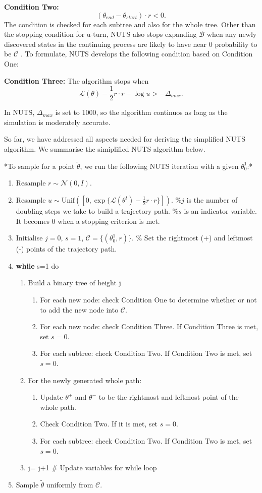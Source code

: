 \documentclass{article}
\begin{document}
\textbf{Condition Two:}
$$(\theta_{end}-\theta_{start})\cdot r < 0.$$
The condition is checked for each subtree and also for the whole tree. Other than the stopping condition for u-turn, NUTS also stops expanding $\mathcal{B}$ when any newly discovered states in the continuing process are likely to have near 0 probability to be $\mathcal{C}$ . To formulate, NUTS develops the following condition based on Condition One:

\textbf{Condition Three:}
The algorithm stops when
$$\mathcal{L}(\theta) -\frac{1}{2}r\cdot r -\log u > -\Delta_{max}.$$

In NUTS, $\Delta_{max}$ is set to 1000, so the algorithm continuos as long as the simulation is moderately accurate.

So far, we have addressed all aspects needed for deriving the simplified NUTS algorithm. We summarise the simiplified NUTS algorithm below.

*To sample for a point $\tilde{\theta}$, we run the following NUTS iteration with a given $\theta_0^1$:*

\begin{enumerate}
\item Resample $r\sim\mathcal{N}(0,I)$.
\item Resample $u\sim\text{Unif}([0,\exp\{\mathcal{L}(\theta^t)-\frac{1}{2}r\cdot r\}])$.
$\%j$ is the number of doubling steps we take to build a trajectory path.
$\%s$ is an indicator variable. It becomes 0 when a stopping criterion is met.
\item Initialise $j=0$, $s=1$, $\mathcal{C}=\{(\theta_0^1,r)\}$. $\%$ Set the rightmost (+) and leftmost (-) points of the trajectory path.
\item \textbf{while} s=1 do
\begin{enumerate}
\item Build a binary tree of height j
\begin{enumerate}
\item For each new node: check Condition One to determine whether or not to add the new node into $\mathcal{C}$.
\item For each new node: check Condition Three. If Condition Three is met, set $s=0$.
\item For each subtree: check Condition Two. If Condition Two is met, set $s=0$.
\end{enumerate}
\item For the newly generated whole path:
\begin{enumerate}
\item Update $\theta^{+}$ and $\theta^{-}$ to be the rightmost and leftmost point of the whole path.
\item Check Condition Two. If it is met, set $s=0$.
\item For each subtree: check Condition Two. If Condition Two is met, set $s=0$.
\end{enumerate}
\item  j= j+1 $\#$ Update variables for while loop
\end{enumerate}
\item Sample $\tilde{\theta}$ uniformly from $\mathcal{C}$.
\end{enumerate}
\end{document}
